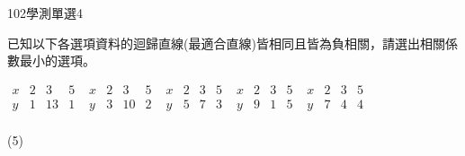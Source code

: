 \begin{QUESTIONS}
    \begin{QUESTION}
        \begin{ExamInfo}{102}{學測}{單選}{4}
        \end{ExamInfo}
        \begin{ExamAnsRateInfo}{30}{46}{25}{19}
        \end{ExamAnsRateInfo}
        \begin{QBODY}
            已知以下各選項資料的迴歸直線(最適合直線)皆相同且皆為負相關，請選出相關係數最小的選項。
			\begin{QOPS}
				\QOP $\begin{matrix}
				   x & 2 & 3 & 5  \\
				   y & 1 & 13 & 1  \\
				\end{matrix}$	
				\QOP $\begin{matrix}
				   x & 2 & 3 & 5  \\
				   y & 3 & 10 & 2  \\
				\end{matrix}$ 	
				\QOP $\begin{matrix}
				   x & 2 & 3 & 5  \\
				   y & 5 & 7 & 3  \\
				\end{matrix}$ 
				\QOP $\begin{matrix}
				   x & 2 & 3 & 5  \\
				   y & 9 & 1 & 5  \\
				\end{matrix}$	
				\QOP $\begin{matrix}
				   x & 2 & 3 & 5  \\
				   y & 7 & 4 & 4  \\
				\end{matrix}$
			\end{QOPS}
        \end{QBODY}
        \begin{QFROMS}
        \end{QFROMS}
        \begin{QTAGS}\end{QTAGS}
        \begin{QANS}
            (5)
        \end{QANS}
        \begin{QSOLLIST}
        \end{QSOLLIST}
        \begin{QEMPTYSPACE}

\end{QEMPTYSPACE}
\end{QUESTION}
\end{QUESTIONS}
